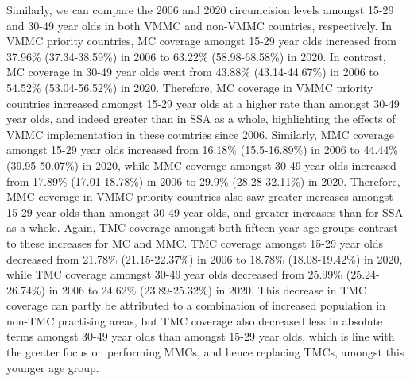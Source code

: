 \documentclass{article}
\begin{document}
Similarly, we can compare the 2006 and 2020 circumcision levels amongst 15-29 and 30-49 year olds in both VMMC and non-VMMC countries, respectively. In VMMC priority countries, MC coverage amongst 15-29 year olds increased from 37.96\% (37.34-38.59\%) in 2006 to 63.22\% (58.98-68.58\%) in 2020. In contrast, MC coverage in 30-49 year olds went from 43.88\% (43.14-44.67\%) in 2006 to 54.52\% (53.04-56.52\%) in 2020. Therefore, MC coverage in VMMC priority countries increased amongst 15-29 year olds at a higher rate than amongst 30-49 year olds, and indeed greater than in SSA as a whole, highlighting the effects of VMMC implementation in these countries since 2006. Similarly, MMC coverage amongst 15-29 year olds increased from 16.18\% (15.5-16.89\%) in 2006 to 44.44\% (39.95-50.07\%) in 2020, while MMC coverage amongst 30-49 year olds increased from 17.89\% (17.01-18.78\%) in 2006 to 29.9\% (28.28-32.11\%) in 2020. Therefore, MMC coverage in VMMC priority countries also saw greater increases amongst 15-29 year olds than amongst 30-49 year olds, and greater increases than for SSA as a whole. Again, TMC coverage amongst both fifteen year age groups contrast to these increases for MC and MMC. TMC coverage amongst 15-29 year olds decreased from 21.78\% (21.15-22.37\%) in 2006 to 18.78\% (18.08-19.42\%) in 2020, while TMC coverage amongst 30-49 year olds decreased from 25.99\% (25.24-26.74\%) in 2006 to 24.62\% (23.89-25.32\%) in 2020. This decrease in TMC coverage can partly be attributed to a combination of increased population in non-TMC practising areas, but TMC coverage also decreased less in absolute terms amongst 30-49 year olds than amongst 15-29 year olds, which is line with the greater focus on performing MMCs, and hence replacing TMCs, amongst this younger age group.
\end{document}

